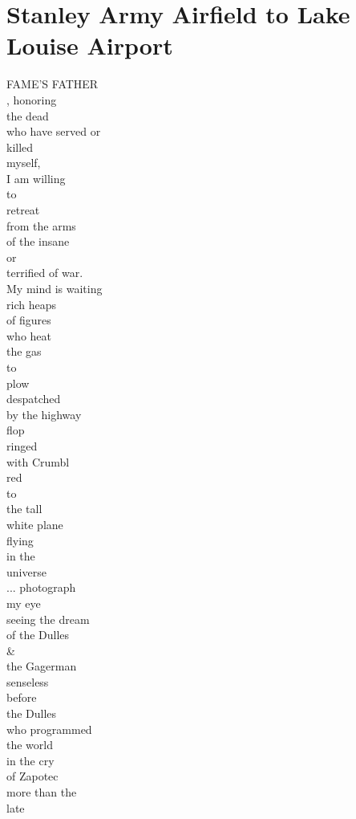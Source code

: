 \documentclass[smalldemyvopaper,11pt,twoside,onecolumn,openright,extrafontsizes]{memoir}
\begin{document}
\chapter{Stanley Army Airfield to Lake Louise Airport}
FAME'S FATHER
\\, honoring
\\the dead
\\who have served or
\\killed
\\myself,
\\I am willing
\\to
\\retreat
\\from the arms
\\of the insane
\\or
\\terrified of war.
\\My mind is waiting
\\rich heaps
\\of figures
\\who heat
\\the gas
\\to
\\plow
\\despatched
\\by the highway
\\flop
\\ringed
\\with Crumbl
\\red
\\to
\\the tall
\\white plane
\\flying
\\in the
\\universe
\\... photograph
\\my eye
\\seeing the dream
\\of the Dulles
\\\&
\\the Gagerman
\\senseless
\\before
\\the Dulles
\\who programmed
\\the world
\\in the cry
\\of Zapotec
\\more than the
\\late
\end{document}
